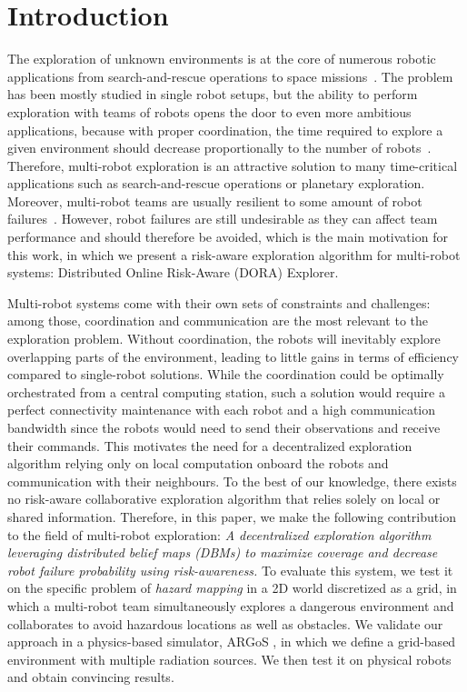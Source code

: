 \section{Introduction}
The exploration of unknown environments is at the core of numerous
robotic applications from search-and-rescue operations
\cite{matos2016multiple} to space
missions~\cite{fong2005interaction}. The problem has been mostly
studied in single robot setups, but the ability to perform exploration
with teams of robots opens the door to even more ambitious
applications, because with proper coordination, the time required to
explore a given environment should decrease proportionally to the
number of robots~\cite{burgard2005coordinated}. Therefore, multi-robot
exploration is an attractive solution to many time-critical
applications such as search-and-rescue operations or planetary
exploration. Moreover, multi-robot teams are usually resilient to some
amount of robot
failures~\cite{ramachandran2019resilience,wehbe2021probabilistic,winfield2006safety}. However,
robot failures are still undesirable as they can affect team
performance and should therefore be avoided, which is the main
motivation for this work, in which we present a risk-aware exploration
algorithm for multi-robot systems: Distributed Online Risk-Aware
(DORA) Explorer.

Multi-robot systems come with their own sets of constraints and
challenges: among those, coordination and communication are the most
relevant to the exploration problem. Without coordination, the robots
will inevitably explore overlapping parts of the environment, leading
to little gains in terms of efficiency compared to single-robot
solutions. While the coordination could be optimally orchestrated from
a central computing station, such a solution would require a perfect
connectivity maintenance with each robot and a high communication
bandwidth since the robots would need to send their observations and
receive their commands. This motivates the need for a decentralized
exploration algorithm relying only on local computation onboard the
robots and communication with their neighbours. To the best of our knowledge, there exists no risk-aware collaborative
exploration algorithm that relies solely on local or shared
information. Therefore, in this paper, we make the following
contribution to the field of multi-robot exploration: \textit{A
  decentralized exploration algorithm leveraging distributed belief
  maps (DBMs) to maximize coverage and decrease robot failure
  probability using risk-awareness.} To
evaluate this system, we test it on the specific problem of
\emph{hazard mapping} in a 2D world discretized as a grid, in which a
multi-robot team simultaneously explores a dangerous environment and
collaborates to avoid hazardous locations as well as obstacles. We validate our approach in a physics-based simulator, ARGoS
\cite{Pinciroli:SI2012}, in which we define a grid-based environment
with multiple radiation sources. We then test it on physical
robots and obtain convincing results. 

